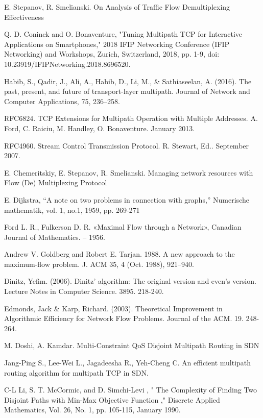 \documentclass[a4paper]{article}
\begin{document}
\newpage
\begin{thebibliography}{14}
E. Stepanov, R. Smelianski. On Analysis of Traffic Flow Demultiplexing Effectiveness

Q. D. Coninck and O. Bonaventure, "Tuning Multipath TCP for Interactive Applications on Smartphones," 2018 IFIP Networking Conference (IFIP Networking) and Workshops, Zurich, Switzerland, 2018, pp. 1-9, doi: 10.23919/IFIPNetworking.2018.8696520.

Habib, S., Qadir, J., Ali, A., Habib, D., Li, M., \& Sathiaseelan, A. (2016). The past, present, and future of transport-layer multipath. Journal of Network and Computer Applications, 75, 236–258.

RFC6824. TCP Extensions for Multipath Operation with Multiple Addresses. A. Ford, C. Raiciu, M. Handley, O. Bonaventure. January 2013.

RFC4960. Stream Control Transmission Protocol. R. Stewart, Ed.. September 2007.

E. Chemeritskiy, E. Stepanov, R. Smelianski. Managing network resources with Flow (De) Multiplexing Protocol

E. Dijkstra, “A note on two problems in connection with graphs,” Numerische mathematik, vol. 1, no.1, 1959, pp. 269-271

Ford L. R., Fulkerson D. R. «Maximal Flow through a Network», Canadian Journal of Mathematics. – 1956.

Andrew V. Goldberg and Robert E. Tarjan. 1988. A new approach to the maximum-flow problem. J. ACM 35, 4 (Oct. 1988), 921–940.

Dinitz, Yefim. (2006). Dinitz' algorithm: The original version and even's version. Lecture Notes in Computer Science. 3895. 218-240.

Edmonds, Jack \& Karp, Richard. (2003). Theoretical Improvement in Algorithmic Efficiency for Network Flow Problems. Journal of the ACM. 19. 248-264.

M. Doshi, A. Kamdar. Multi-Constraint QoS Disjoint Multipath Routing in SDN

Jang-Ping S., Lee-Wei L., Jagadeesha R., Yeh-Cheng C. An efficient multipath routing algorithm for multipath TCP in SDN.

C-L Li, S. T. McCormic, and D. Simchi-Levi , " The Complexity of
Finding Two Disjoint Paths with Min-Max Objective Function ,"
Discrete Applied Mathematics, Vol. 26, No. 1, pp. 105-115, January
1990.
\end{thebibliography}
\end{document}
